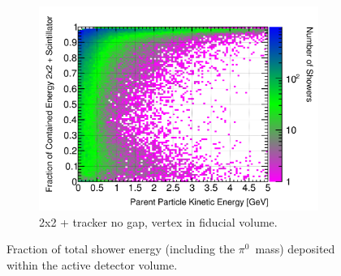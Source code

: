 \documentclass[10pt,a4paper,openany]{article}
\begin{document}
\begin{figure}[!htb]
\begin{subfigure}[b]{0.49\textwidth}
		\includegraphics[width=1.0\textwidth]{Pi0_contained_frac_2x2_Scintillator_fiducial.png}
		\caption{2x2 + tracker no gap, vertex in fiducial volume.}
		\label{}
	\end{subfigure}	
  \caption{Fraction of total shower energy (including the $\pi^{0}$~mass) deposited within the active detector volume.}
\end{figure}

\clearpage
\end{document}
